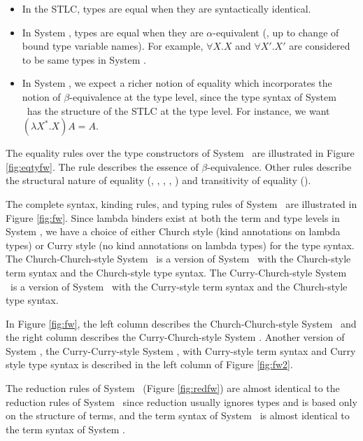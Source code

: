 \begin{itemize}
\item In the STLC, types are equal when they are syntactically identical.
\item In System \F, types are equal when they are $\alpha$-equivalent
(\ie, up to change of bound type variable names). For example,
$\forall X.X$ and $\forall X'.X'$ are considered to be same types in System \F.

\item
In System \Fw, we expect a richer notion of equality which
incorporates the notion of 
$\beta$-equivalence at the type level,
since the type syntax of System \Fw\ has the structure of the STLC at the type level.
For instance, we want $(\lambda X^{*}.X) A = A$. 
\end{itemize}

The equality rules over the
type constructors of System \Fw\ are illustrated in Figure \ref{fig:eqtyfw}.
The  rule describes the essence of $\beta$-equivalence.
Other rules describe the structural nature of equality (,
, , , )
and transitivity of equality ().


The complete syntax, kinding rules, and typing rules of System \Fw\
are illustrated in Figure \ref{fig:fw}. 
Since lambda binders exist at both the term and type levels
in System \Fw, we have a choice of either Church style (kind annotations
on lambda types) or Curry style (no kind annotations on lambda types) for
the type syntax. The Church-Church-style System \Fw\ is a version of System \Fw\ 
with the Church-style term syntax and the Church-style type syntax.
The Curry-Church-style System \Fw\ is a version of System \Fw\ 
with the Curry-style term syntax and the Church-style type syntax.

In Figure \ref{fig:fw}, the left column describes
the Church-Church-style System \Fw\ and the right column describes
the Curry-Church-style System \Fw. 
Another version of System \Fw, the Curry-Curry-style System \Fw,
with Curry-style term syntax and Curry style type syntax is described
in the left column of Figure \ref{fig:fw2}.

The reduction rules of System \Fw\ (Figure \ref{fig:redfw}) are
almost identical to the reduction rules of System \F\ since 
reduction usually ignores types and is based only on the structure of terms,
and the term syntax of System \Fw\ is almost identical to the term syntax of System \F.

